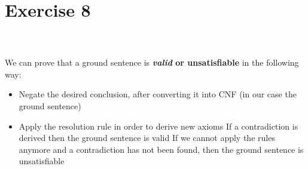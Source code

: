 \documentclass{article}
\begin{document}
\section*{Exercise 8}
\paragraph{}~\\~\\
We can prove that a ground sentence is \textbf{\textit{valid} or \textbf{unsatisfiable}} in the following way:\\
\begin{itemize}
	\item Negate the desired conclusion, after converting it into CNF (in our case the ground sentence)
	\item Apply the resolution rule in order to derive new axioms
	\subitem If a contradiction is derived then the ground sentence is valid
	\subitem If we cannot apply the rules anymore and a contradiction has not
	\subitem been found, then the ground sentence is unsatisfiable
\end{itemize}
\end{document}
